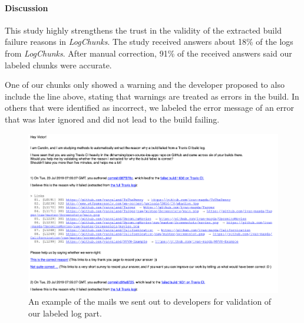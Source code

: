\documentclass[\myrootdir/main.tex]{subfiles}
\begin{document}
\paragraph{Discussion}
This study highly strengthens the trust in the validity of the extracted build failure reasons in \emph{LogChunks}.
The study received answers about 18\% of the logs from \emph{LogChunks}.
After manual correction, 91\% of the received answers said our labeled chunks were accurate.

One of our chunks only showed a warning and the developer proposed to also include the line above, stating that warnings are treated as errors in the build.
In others that were identified as incorrect, we labeled the error message of an error that was later ignored and did not lead to the build failing.

\begin{figure}[h]
	\centering
	\includegraphics[width=\textwidth, clip]{img/dev-mail.png}
	\caption{An example of the mails we sent out to developers for validation of our labeled log part.}
	\label{fig:dev-mail}
\end{figure}
\end{document}
